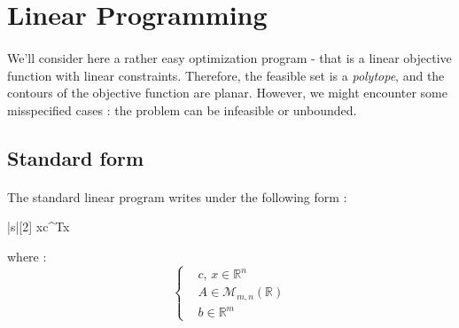 \documentclass[a4paper]{article}
\begin{document}
	
		
	\vhrulefill{2pt}
	
	\tableofcontents
	
	\vhrulefill{2pt}


	\section{Linear Programming}
	{
		\paragraph{} We'll consider here a rather easy optimization program - that is a linear objective function with linear constraints. Therefore, the feasible set is a \emph{polytope}, and the contours of the objective function are planar. However, we might encounter some misspecified cases : the problem can be infeasible or unbounded. 
		
		\subsection{Standard form}
		{
			\paragraph{} The standard linear program writes under the following form : 
			\vspace{5pt}
			
			{
				\vspace{-10pt}
					\begin{mini}|s|[2]
						{x}{c^Tx}
						{\label{eq::standard_lp}}{}
					\end{mini}
			}
			\vspace{5pt}
			
			\noindent where : 
			$$
				\left\{
				\begin{aligned}
					&c,\, x \in \mathbb{R}^n \\
					&A \in \mathcal{M}_{m,n}(\mathbb{R}) \\
					&b \in \mathbb{R}^m
				\end{aligned}\right.
			$$
			\vspace{5pt}
			
}}
\end{document}
